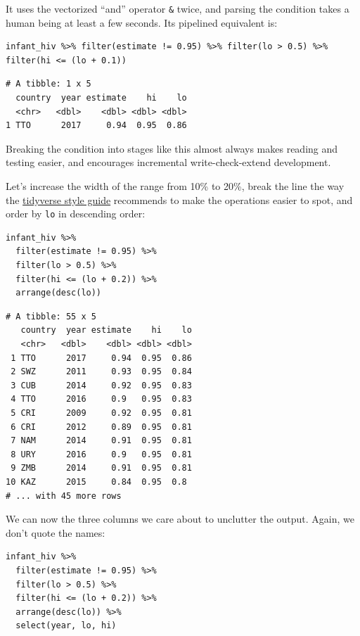 \noindent
It uses the vectorized ``and'' operator \texttt{\&} twice,
and parsing the condition takes a human being at least a few seconds.
Its pipelined equivalent is:

\begin{lstlisting}
infant_hiv %>% filter(estimate != 0.95) %>% filter(lo > 0.5) %>% filter(hi <= (lo + 0.1))
\end{lstlisting}

\begin{lstlisting}
# A tibble: 1 x 5
  country  year estimate    hi    lo
  <chr>   <dbl>    <dbl> <dbl> <dbl>
1 TTO      2017     0.94  0.95  0.86
\end{lstlisting}

\noindent
Breaking the condition into stages like this almost always makes reading and testing easier,
and encourages incremental write-check-extend development.

Let's increase the width of the range from 10\% to 20\%,
break the line the way the \href{http://style.tidyverse.org/}{tidyverse style guide} recommends
to make the operations easier to spot,
and order by \texttt{lo} in descending order:

\begin{lstlisting}
infant_hiv %>%
  filter(estimate != 0.95) %>%
  filter(lo > 0.5) %>%
  filter(hi <= (lo + 0.2)) %>%
  arrange(desc(lo))
\end{lstlisting}

\begin{lstlisting}
# A tibble: 55 x 5
   country  year estimate    hi    lo
   <chr>   <dbl>    <dbl> <dbl> <dbl>
 1 TTO      2017     0.94  0.95  0.86
 2 SWZ      2011     0.93  0.95  0.84
 3 CUB      2014     0.92  0.95  0.83
 4 TTO      2016     0.9   0.95  0.83
 5 CRI      2009     0.92  0.95  0.81
 6 CRI      2012     0.89  0.95  0.81
 7 NAM      2014     0.91  0.95  0.81
 8 URY      2016     0.9   0.95  0.81
 9 ZMB      2014     0.91  0.95  0.81
10 KAZ      2015     0.84  0.95  0.8 
# ... with 45 more rows
\end{lstlisting}

We can now  the three columns we care about
to unclutter the output.
Again, we don't quote the names:

\begin{lstlisting}
infant_hiv %>%
  filter(estimate != 0.95) %>%
  filter(lo > 0.5) %>%
  filter(hi <= (lo + 0.2)) %>%
  arrange(desc(lo)) %>%
  select(year, lo, hi)
\end{lstlisting}

